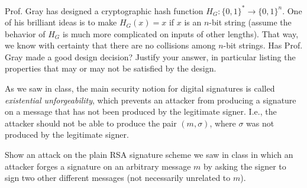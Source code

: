 \documentclass[12pt,addpoints,answers]{exam}
\begin{document}
\begin{questions}

\newpage

\question[10] Prof. Gray has designed a cryptographic hash function $H_G : \{0, 1\}^\ast \rightarrow \{0, 1\}^n$. One of his brilliant ideas is to make $H_G(x) = x$ if $x$ is an $n$-bit string (assume the behavior of $H_G$ is much more complicated on inputs of other lengths). That way, we know with certainty that there are no collisions among $n$-bit strings. Has Prof. Gray made a good design decision? Justify your answer, in particular listing the properties that may or may not be satisfied by the design.



\newpage

\question[10] As we saw in class, the main security notion for digital signatures is called {\em existential unforgeability}, which prevents an attacker from producing a signature on a message that has not been produced by the legitimate signer. I.e., the attacker should not be able to produce the pair $(m, \sigma)$, where $\sigma$ was not produced by the legitimate signer.

Show an attack on the plain RSA signature scheme we saw in class in which an attacker forges a signature on an arbitrary message $m$ by asking the signer to sign two other different messages (not necessarily unrelated to $m$).


\end{questions}
\end{document}
